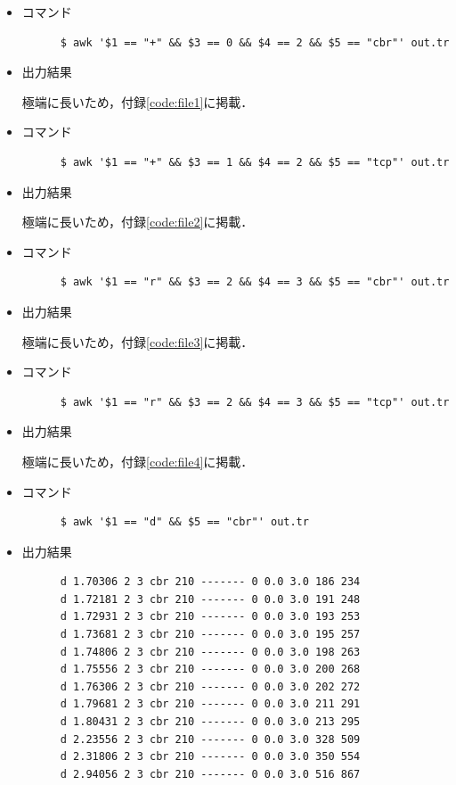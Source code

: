 \documentclass[paper=a4, fontsize=10pt]{jlreq}
\begin{document}
\begin{itemize}
  \item コマンド
    \begin{lstlisting}
      $ awk '$1 == "+" && $3 == 0 && $4 == 2 && $5 == "cbr"' out.tr
    \end{lstlisting}

  \item 出力結果

    極端に長いため，付録\ref{code:file1}に掲載．

  \item コマンド
    \begin{lstlisting}
      $ awk '$1 == "+" && $3 == 1 && $4 == 2 && $5 == "tcp"' out.tr
    \end{lstlisting}

  \item 出力結果 

    極端に長いため，付録\ref{code:file2}に掲載．

  \item コマンド
    \begin{lstlisting}
      $ awk '$1 == "r" && $3 == 2 && $4 == 3 && $5 == "cbr"' out.tr
    \end{lstlisting}

  \item 出力結果 

    極端に長いため，付録\ref{code:file3}に掲載．

  \item コマンド
    \begin{lstlisting}
      $ awk '$1 == "r" && $3 == 2 && $4 == 3 && $5 == "tcp"' out.tr
    \end{lstlisting}

  \item 出力結果 
  
    極端に長いため，付録\ref{code:file4}に掲載．

  \item コマンド
    \begin{lstlisting}
      $ awk '$1 == "d" && $5 == "cbr"' out.tr
    \end{lstlisting}

  \item 出力結果 
    \begin{lstlisting}
      d 1.70306 2 3 cbr 210 ------- 0 0.0 3.0 186 234
      d 1.72181 2 3 cbr 210 ------- 0 0.0 3.0 191 248
      d 1.72931 2 3 cbr 210 ------- 0 0.0 3.0 193 253
      d 1.73681 2 3 cbr 210 ------- 0 0.0 3.0 195 257
      d 1.74806 2 3 cbr 210 ------- 0 0.0 3.0 198 263
      d 1.75556 2 3 cbr 210 ------- 0 0.0 3.0 200 268
      d 1.76306 2 3 cbr 210 ------- 0 0.0 3.0 202 272
      d 1.79681 2 3 cbr 210 ------- 0 0.0 3.0 211 291
      d 1.80431 2 3 cbr 210 ------- 0 0.0 3.0 213 295
      d 2.23556 2 3 cbr 210 ------- 0 0.0 3.0 328 509
      d 2.31806 2 3 cbr 210 ------- 0 0.0 3.0 350 554
      d 2.94056 2 3 cbr 210 ------- 0 0.0 3.0 516 867
    \end{lstlisting}


\end{itemize}
\end{document}
